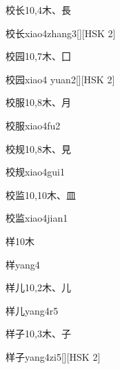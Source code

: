\begin{entry}{校长}{10,4}{⽊、⾧}
  \begin{phonetics}{校长}{xiao4zhang3}[][HSK 2]
  \end{phonetics}
\end{entry}

\begin{entry}{校园}{10,7}{⽊、⼞}
  \begin{phonetics}{校园}{xiao4 yuan2}[][HSK 2]
  \end{phonetics}
\end{entry}

\begin{entry}{校服}{10,8}{⽊、⽉}
  \begin{phonetics}{校服}{xiao4fu2}
  \end{phonetics}
\end{entry}

\begin{entry}{校规}{10,8}{⽊、⾒}
  \begin{phonetics}{校规}{xiao4gui1}
  \end{phonetics}
\end{entry}

\begin{entry}{校监}{10,10}{⽊、⽫}
  \begin{phonetics}{校监}{xiao4jian1}
  \end{phonetics}
\end{entry}

\begin{entry}{样}{10}{⽊}
  \begin{phonetics}{样}{yang4}
  \end{phonetics}
\end{entry}

\begin{entry}{样儿}{10,2}{⽊、⼉}
  \begin{phonetics}{样儿}{yang4r5}
  \end{phonetics}
\end{entry}

\begin{entry}{样子}{10,3}{⽊、⼦}
  \begin{phonetics}{样子}{yang4zi5}[][HSK 2]
  \end{phonetics}
\end{entry}

